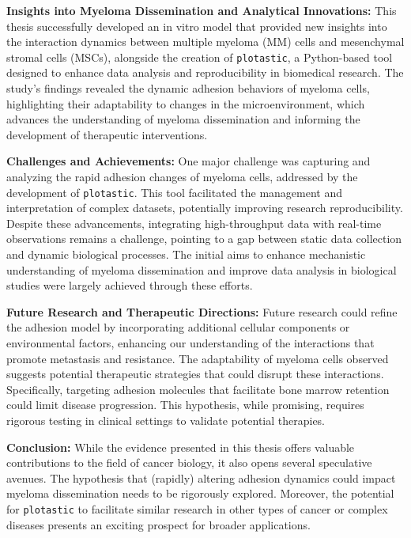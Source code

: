 

%
\label{sec:discussion_overall_conclusion}%
%
\textbf{Insights into Myeloma Dissemination and Analytical Innovations:}
This thesis successfully developed an in vitro model that provided new insights
into the interaction dynamics between multiple myeloma (MM) cells and
mesenchymal stromal cells (MSCs), alongside the creation of \texttt{plotastic},
a Python-based tool designed to enhance data analysis and reproducibility in
biomedical research. The study's findings revealed the dynamic adhesion
behaviors of myeloma cells, highlighting their adaptability to changes in the
microenvironment, which advances the understanding of myeloma dissemination and
 informing the development of therapeutic interventions.

\textbf{Challenges and Achievements:}
One major challenge was capturing and analyzing the rapid adhesion changes of
myeloma cells, addressed by the development of \texttt{plotastic}. This tool
facilitated the management and interpretation of complex datasets, potentially
improving research reproducibility. Despite these advancements, integrating
high-throughput data with real-time observations remains a challenge, pointing
to a gap between static data collection and dynamic biological processes. The
initial aims to enhance mechanistic understanding of myeloma dissemination and
improve data analysis in biological studies were largely achieved through these
efforts.

\textbf{Future Research and Therapeutic Directions:}
Future research could refine the adhesion model by incorporating additional
cellular components or environmental factors, enhancing our understanding of the
interactions that promote metastasis and resistance. The adaptability of myeloma
cells observed suggests potential therapeutic strategies that could disrupt
these interactions. Specifically, targeting adhesion molecules that facilitate
bone marrow retention could limit disease progression. This hypothesis,
while promising, requires rigorous testing in clinical settings to validate
potential therapies.

\textbf{Conclusion:}
While the evidence presented in this thesis offers valuable contributions to the
field of cancer biology, it also opens several speculative avenues. The
hypothesis that (rapidly) altering adhesion dynamics could impact myeloma
dissemination needs to be rigorously explored. Moreover, the potential for
\texttt{plotastic} to facilitate similar research in other types of cancer or
complex diseases presents an exciting prospect for broader applications.

